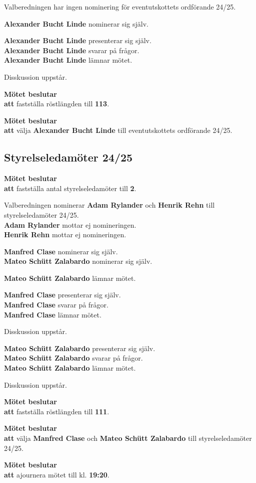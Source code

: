 \documentclass{datateknologsektionen-document}
\newcommand{\ind}{\hspace*{2em}}
\newcommand{\motetbeslutar}{\textbf{Mötet beslutar}}
\newcommand{\att}{\\\ind\textbf{att}}
\newcommand{\rostlangd}[1]{\motetbeslutar\att{} fastställa röstlängden till \textbf{#1}.}
\begin{document}
Valberedningen har ingen nominering för eventutskottets ordförande 24/25.

\textbf{Alexander Bucht Linde} nominerar sig själv. 

\textbf{Alexander Bucht Linde} presenterar sig själv.\\
\textbf{Alexander Bucht Linde} svarar på frågor.\\
\textbf{Alexander Bucht Linde} lämnar mötet.

Disskussion uppstår.

\rostlangd{113}

\motetbeslutar\att{} välja \textbf{Alexander Bucht Linde} till eventutskottets ordförande 24/25.

\subsection{Styrelseledamöter 24/25}

\motetbeslutar\att{} fastställa antal styrelseledamöter till \textbf{2}.

Valberedningen nominerar \textbf{Adam Rylander} och \textbf{Henrik Rehn} till styrelseledamöter 24/25. \\
\textbf{Adam Rylander} mottar ej nomineringen.\\
\textbf{Henrik Rehn} mottar ej nomineringen. 

\textbf{Manfred Clase} nominerar sig själv.\\
\textbf{Mateo Schütt Zalabardo} nominerar sig själv. 

\textbf{Mateo Schütt Zalabardo} lämnar mötet.

\textbf{Manfred Clase} presenterar sig själv.\\
\textbf{Manfred Clase} svarar på frågor.\\
\textbf{Manfred Clase} lämnar mötet.

Disskussion uppstår.

\textbf{Mateo Schütt Zalabardo} presenterar sig själv.\\
\textbf{Mateo Schütt Zalabardo} svarar på frågor.\\
\textbf{Mateo Schütt Zalabardo} lämnar mötet.

Disskussion uppstår.

\rostlangd{111}

\motetbeslutar\att{} välja \textbf{Manfred Clase} och \textbf{Mateo Schütt Zalabardo} till styrelseledamöter 24/25.

\motetbeslutar\att{} ajournera mötet till kl. \textbf{19:20}.
\end{document}
